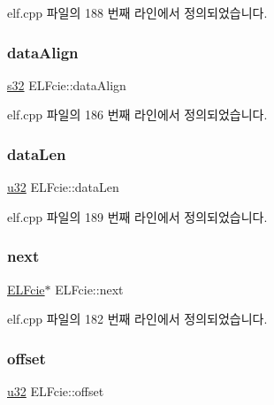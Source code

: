elf.\+cpp 파일의 188 번째 라인에서 정의되었습니다.

\mbox{\label{struct_e_l_fcie_af5d3149b3520f0d56dd96c6f0df8e60f}} 
\subsubsection{\texorpdfstring{data\+Align}{dataAlign}}
{\footnotesize\ttfamily \mbox{\hyperlink{_system_8h_a0ce6887c26c1c49ad3be5710dd42bfd6}{s32}} E\+L\+Fcie\+::data\+Align}



elf.\+cpp 파일의 186 번째 라인에서 정의되었습니다.

\mbox{\label{struct_e_l_fcie_a19efbc40471e1308ea700858a74aaa49}} 
\subsubsection{\texorpdfstring{data\+Len}{dataLen}}
{\footnotesize\ttfamily \mbox{\hyperlink{_system_8h_a10e94b422ef0c20dcdec20d31a1f5049}{u32}} E\+L\+Fcie\+::data\+Len}



elf.\+cpp 파일의 189 번째 라인에서 정의되었습니다.

\mbox{\label{struct_e_l_fcie_a478060c105cc829f5b800d20d05d4901}} 
\subsubsection{\texorpdfstring{next}{next}}
{\footnotesize\ttfamily \mbox{\hyperlink{struct_e_l_fcie}{E\+L\+Fcie}}$\ast$ E\+L\+Fcie\+::next}



elf.\+cpp 파일의 182 번째 라인에서 정의되었습니다.

\mbox{\label{struct_e_l_fcie_ad77ede21a2619e2a994435f11df3cf53}} 
\subsubsection{\texorpdfstring{offset}{offset}}
{\footnotesize\ttfamily \mbox{\hyperlink{_system_8h_a10e94b422ef0c20dcdec20d31a1f5049}{u32}} E\+L\+Fcie\+::offset}



